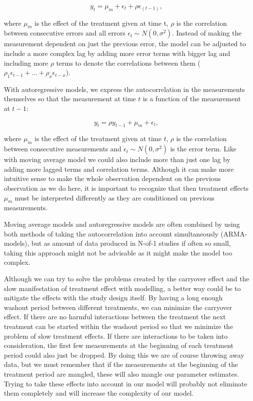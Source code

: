 \documentclass[12pt,a4paper,leqno]{report}
\theoremstyle{plain}
\theoremstyle{definition}
\theoremstyle{remark}
\begin{document}
\begin{def}\label{}
    \begin{equation}\label{movingaverage}
        y_t = \mu_m + \epsilon_t + \rho\epsilon_{(t - 1)},
    \end{equation}
\end{def}where \(\mu_m\) is the effect of the treatment given at time t, \(\rho
\) is the correlation between consecutive errors and all errors \(\epsilon_t \sim
N(0,\sigma^2) \). Instead of making the measurement dependent on just the previous error, the model
can be adjusted to include a more complex lag by adding more error terms with
bigger lag and including more \(\rho \) terms to denote the correlations between
them (\(\rho_1\epsilon_{t-1} + \ldots + \rho_x\epsilon_{t-x}\)).

With autoregressive models, we express the autocorrelation in the
measurements themselves so that the measurement at time \(t\) is a function of
the measurement at \(t-1\):

\begin{def}\label{}
    \begin{equation}\label{}
        y_t = \rho y_{t-1} + \mu_m + \epsilon_t,
    \end{equation}
\end{def}where \(\mu_m\) is the effect of the treatment given at time \(t\),
\(\rho \) is the correlation between consecutive measurements and \(\epsilon_t
\sim N(0,\sigma^2)\) is the error term. Like with moving average model we could
also include more than just one lag by adding more lagged terms and correlation
terms. Although it can make more intuitive sense to make the whole observation
dependent on the previous observation as we do here, it is important to recognize
that then treatment effects \(\mu_m\) must be interpreted differently as they are
conditioned on previous measurements.

Moving average models and autoregressive models are often combined by using both
methods of taking the autocorrelation into account simultaneously (ARMA-models), but as
amount of data produced in N-of-1 studies if often so small, taking this approach might
not be advisable as it might make the model too complex.

Although we can try to solve the problems created by the carryover effect and the slow
manifestation of treatment effect with modelling, a better way could be to mitigate the
effects with the study design itself. By having a long
enough washout period between different treatments, we can minimize the
carryover effect. If there are no harmful interactions between the treatment the
next treatment can be started within the washout period so that we minimize the
problem of slow treatment effects. If there are interactions to be taken into
consideration, the first few measurements at the beginning of each treatment
period could also just be dropped. By doing this we are of course throwing away
data, but we must remember that if the measurements at the beginning of the
treatment period are mangled, these will also mangle our parameter estimates.
Trying to take these effects into account in our model will probably not
eliminate them completely and will increase the complexity of our
model.
\end{document}
